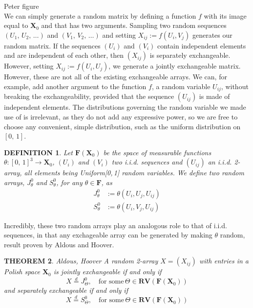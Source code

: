 \documentclass[12pt]{report}
\newtheorem{theorem}{THEOREM}
\newtheorem{definition}[theorem]{DEFINITION}
\newcommand{\bs}{\boldsymbol}
\renewcommand{\bs}{\boldsymbol}
\begin{document}
Peter figure \\

We can simply generate a random matrix by defining a function $f$ with its image equal to $\bs{X}_0$ and that has two arguments. Sampling two random sequences $(U_1,\,U_2,\,\dots)$ and $(V_1,\,V_2,\,\dots)$ and setting $X_{ij} := f(U_i, V_j)$ generates our random matrix. If the sequences $(U_i)$ and $(V_i)$ contain independent elements and are independent of each other, then $(X_{ij})$ is separately exchangeable. However, setting $X_{ij} := f(U_i, U_j)$, we generate a jointly exchangeable matrix. However, these are not all of the existing exchangeable arrays. We can, for example, add another argument to the function $f$, a random variable $U_{ij}$, without breaking the exchangeability, provided that the sequence $(U_{ij})$ is made of independent elements. The distributions governing the random variable we made use of is irrelevant, as they do not add any expressive power, so we are free to choose any convenient, simple distribution, such as the uniform distribution on $[0,\, 1]$. \\

\begin{definition}
    Let $\bs{F}(\bs{X}_0)$ be the space of measurable functions $\theta : [0,\,1]^3 \rightarrow \bs{X}_0$, $(U_i)$ and $(V_i)$ two i.i.d. sequences and $(U_{ij})$ an i.i.d. 2-array, all elements being Uniform[0,\,1] random variables. We define two random arrays, $J_\theta^0$ and $S_\theta^0$, for any $\theta \in \bs{F}$, as
    \begin{align}
        J_\theta^0 &:= \theta(U_i, U_j, U_{ij}) \\
        S_\theta^0 &:= \theta(U_i, V_j, U_{ij})
    \end{align}
\end{definition}

Incredibly, these two random arrays play an analogous role to that of i.i.d. sequences, in that any exchageable array can be generated by making $\theta$ random, result proven by Aldous and Hoover. \\

\begin{theorem}{Aldous, Hoover}
    A random 2-array $X = (X_{ij})$ with entries in a Polish space $\bs{X}_0$ is jointly exchangeable if and only if
    \begin{equation}
        X \overset{d}{=} J_\Theta^0,\quad \text{for some}\, \Theta \in \bs{RV}(\bs{F}(\bs{X}_0))
    \end{equation}
and separately exchangeable if and only if
    \begin{equation}
        X \overset{d}{=} S_\Theta^0,\quad \text{for some}\, \Theta \in \bs{RV}(\bs{F}(\bs{X}_0))
    \end{equation}
\end{theorem}
\end{document}
